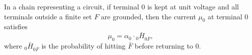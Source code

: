 In a chain representing a circuit, if terminal $0$ is kept at unit voltage and all terminals outside a finite set $F$ are grounded, then the current $\mu_0$ at terminal $0$ satisfies
$$\mu_0 = \alpha_0 \cdot {}_0 \bar{H}_{0\bar{F}},$$
where ${}_0 \bar{H}_{0\bar{F}}$ is the probability of hitting $\bar{F}$ before returning to $0$.
